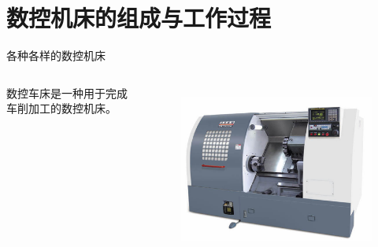 \documentclass[UTF8,zihao=-4]{ctexbeamer}
\begin{document}
\section{数控机床的组成与工作过程}

\begin{frame}{各种各样的数控机床}
\begin{columns}
	数控车床是一种用于完成车削加工的数控机床。
	
    \begin{figure}
    	\centering
    	\includegraphics[width= \linewidth]{image/1-1}
    	\label{fig:1-1}
    \end{figure}
\end{columns}
\end{frame}
\end{document}
